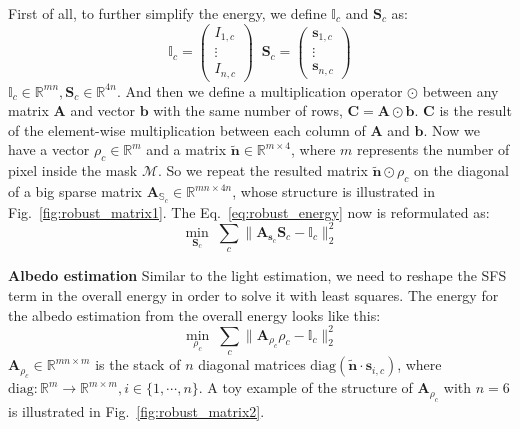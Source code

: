 First of all, to further simplify the energy, we define $\mathbb{I}_c$ and $\mathbf{S}_c$ as:
\begin{equation}\label{eq:robust_energy_prepare}
\mathbb{I}_c = \begin{pmatrix} I_{1,c} \\ \vdots \\ I_{n,c} \end{pmatrix}  \; \; \mathbf{S}_c = \begin{pmatrix} \mathbf{s}_{1,c} \\ \vdots \\ \mathbf{s}_{n,c} \end{pmatrix}
\end{equation}
$\mathbb{I}_c \in \mathbb{R}^{mn}, \mathbf{S}_c \in \mathbb{R}^{4n}$.
And then we define a multiplication operator $\odot$ between any matrix $\mathbf{A}$ and vector $\mathbf{b}$ with the same number of rows, $\mathbf{C = A \odot b}$.
$\mathbf{C}$ is the result of the element-wise multiplication between each column of $\mathbf{A}$ and $\mathbf{b}$.
Now we have a vector $\rho_c\in \mathbb{R}^m$ and a matrix $\tilde{\mathbf{n}} \in \mathbb{R}^{m \times 4}$, where $m$ represents the number of pixel inside the mask $\mathcal{M}$.
So we repeat the resulted matrix $\tilde{\mathbf{n}} \odot \rho_c$ on the diagonal of a big sparse matrix $\mathbf{A}_{\mathbb{S}_c} \in \mathbb{R}^{mn \times 4n}$, whose structure is illustrated in Fig.~\ref{fig:robust_matrix1}.
The Eq.~\ref{eq:robust_energy} now is reformulated as:
\begin{equation}\label{eq:robust_light_estimate2}
    \min_{\mathbf{S}_c} \; \sum_{c} \lVert \mathbf{A}_{\mathbf{s}_c}\mathbf{S}_c  - \mathbb{I}_c \rVert_2^2
\end{equation}

\textbf{Albedo estimation}
Similar to the light estimation, we need to reshape the SFS term in the overall energy in order to solve it with least squares.
The energy for the albedo estimation from the overall energy looks like this:
\begin{equation}\label{eq:robust_albedo_estimate}
    \min_{\rho_c} \; \sum_{c}\lVert \mathbf{A}_{\rho_c}\rho_c - \mathbb{I}_c \rVert^2_2 
\end{equation}
$ \mathbf{A}_{\rho_c} \in \mathbb{R}^{mn \times m}$ is the stack of $n$ diagonal matrices $\text{diag}(\tilde{\mathbf{n}} \cdot \mathbf{s}_{i,c})$, where $\text{diag} : \mathbb{R}^m \rightarrow \mathbb{R}^{m\times m}, i \in \{1, \cdots, n\}$.
A toy example of the structure of $\mathbf{A}_{\rho_c}$ with $n=6$ is illustrated in Fig.~\ref{fig:robust_matrix2}.

